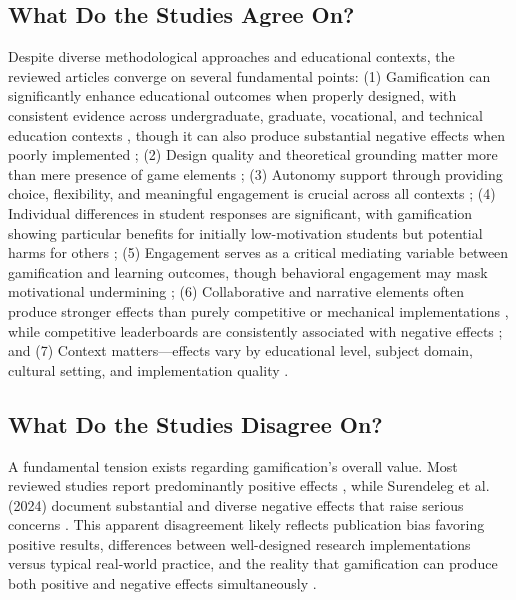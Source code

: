 \documentclass[12pt,a4paper]{article}
\begin{document}
\subsection{What Do the Studies Agree On?}

Despite diverse methodological approaches and educational contexts, the reviewed articles converge on several fundamental points: (1) Gamification can significantly enhance educational outcomes when properly designed, with consistent evidence across undergraduate, graduate, vocational, and technical education contexts \parencite{ryan2025,wu2024,rodriguez2025,toda2022,dahri2024,ojonuba2023,wang2023,sevilla2024}, though it can also produce substantial negative effects when poorly implemented \parencite{surendeleg2024}; (2) Design quality and theoretical grounding matter more than mere presence of game elements \parencite{ryan2025,wu2024,toda2022,surendeleg2024}; (3) Autonomy support through providing choice, flexibility, and meaningful engagement is crucial across all contexts \parencite{ryan2025,wu2024,rodriguez2025,toda2022}; (4) Individual differences in student responses are significant, with gamification showing particular benefits for initially low-motivation students but potential harms for others \parencite{ryan2025,wu2024,rodriguez2025,ojonuba2023,surendeleg2024}; (5) Engagement serves as a critical mediating variable between gamification and learning outcomes, though behavioral engagement may mask motivational undermining \parencite{dahri2024,wu2024,surendeleg2024}; (6) Collaborative and narrative elements often produce stronger effects than purely competitive or mechanical implementations \parencite{wu2024,toda2022,sevilla2024}, while competitive leaderboards are consistently associated with negative effects \parencite{ryan2025,surendeleg2024}; and (7) Context matters—effects vary by educational level, subject domain, cultural setting, and implementation quality \parencite{wu2024,dahri2024,ojonuba2023,surendeleg2024}.


\subsection{What Do the Studies Disagree On?}

A fundamental tension exists regarding gamification's overall value. Most reviewed studies report predominantly positive effects \parencite{wu2024,rodriguez2025,dahri2024,ojonuba2023,wang2023,sevilla2024}, while Surendeleg et al. (2024) document substantial and diverse negative effects that raise serious concerns \parencite{surendeleg2024}. This apparent disagreement likely reflects publication bias favoring positive results, differences between well-designed research implementations versus typical real-world practice, and the reality that gamification can produce both positive and negative effects simultaneously \parencite{surendeleg2024}.
\end{document}
